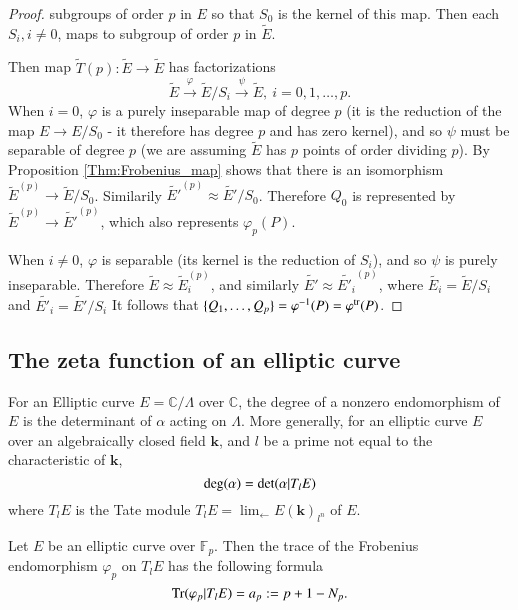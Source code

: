 \documentclass[11pt]{article}
\begin{document}
\begin{proof}
     subgroups of order $p$ in $E$ so that $S_0$ is the kernel of this map. Then each $S_i, i\neq 0$, maps to subgroup of 
     order $p$ in $\tilde{E}$.\par
     Then map $\tilde{T}(p): \tilde{E}\rightarrow \tilde{E}$ has factorizations
     \begin{equation*}
        \tilde{E}\stackrel{\varphi}{\longrightarrow} \tilde{E}/S_i \stackrel{\psi}{\longrightarrow} \tilde{E}, \ i=0,1, \ldots , p.
     \end{equation*}
     When $i=0$, $\varphi$ is a purely inseparable map of degree $p$ (it is the reduction of the map $E\rightarrow E/S_0$
     - it therefore has degree $p$ and has zero kernel), and so $\psi$ must be separable of degree $p$ (we are assuming 
     $\tilde{E}$ has $p$ points of order dividing $p$). By Proposition \ref{Thm:Frobenius_map} shows that there is an isomorphism 
     $\tilde{E}^{(p)} \rightarrow \tilde{E}/S_0$. Similarily $\tilde{E'}^{(p)}\approx \tilde{E'}/S_0$. Therefore $Q_0$ is represented
     by $\tilde{E}^{(p)}\rightarrow\tilde{E'}^{(p)}$, which also represents $\varphi _p(P)$. \par
     When $i\neq 0$, $\varphi$ is separable (its kernel is the reduction of $S_i$), and so $\psi$ is purely inseparable.
     Therefore $\tilde{E}\approx \tilde{E}_i^{(p)}$, and similarly $\tilde{E'}\approx \tilde{E'_i}^{(p)}$, where 
     $\tilde{E_i}=\tilde{E}/S_i$ and $\tilde{E'_i}=\tilde{E'}/S_i$ It follows that $\{Q_1,\ldots, Q_p\}=\varphi^{-1}(P)=\varphi^{\rm tr}(P)$.

\end{proof}


 \subsection{The zeta function of an elliptic curve}
For an Elliptic curve $E=\mathbb{C}/\Lambda$ over $\mathbb{C}$, the degree of a nonzero endomorphism of $E$ is the 
determinant of $\alpha$ acting on $\Lambda$. More generally, for an elliptic curve $E$ over an algebraically closed
field $\mathbf{k}$, and $l$ be a prime not equal to the characteristic of $\mathbf{k}$, 
\begin{equation*}
    {\rm deg}(\alpha)={\rm det}(\alpha|T_lE)
\end{equation*} 
where $T_lE$ is the Tate module $T_lE=\lim_{\longleftarrow} E(\mathbf{k})_{l^n} $ of $E$.
 \begin{proposition}
Let $E$ be an elliptic curve over $\mathbb{F}_p$. Then the trace of the Frobenius endomorphism $\varphi_p$ on $T_l E$ has the following formula
\begin{equation*}
    {\rm Tr}(\varphi_p|T_l E)= a_p:=p+1-N_p.
\end{equation*} 
\label{pro:def_TatesM}
 \end{proposition}
\end{document}

